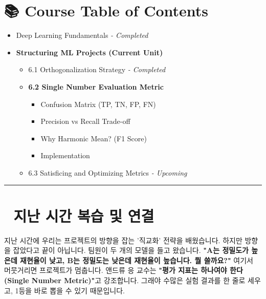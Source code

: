 \documentclass[11pt,a4paper]{book}
\theoremstyle{definition}
\begin{document}
\section*{📚 Course Table of Contents}
\begin{itemize}
    \item[Chapter 1-5.] Deep Learning Fundamentals \textit{- Completed}
    \item[\textbf{Chapter 6.}] \textbf{Structuring ML Projects (Current Unit)}
    \begin{itemize}
        \item 6.1 Orthogonalization Strategy \textit{- Completed}
        \item \textbf{6.2 Single Number Evaluation Metric}
        \begin{itemize}
            \item Confusion Matrix (TP, TN, FP, FN)
            \item Precision vs Recall Trade-off
            \item Why Harmonic Mean? (F1 Score)
            \item Implementation
        \end{itemize}
        \item 6.3 Satisficing and Optimizing Metrics \textit{- Upcoming}
    \end{itemize}
\end{itemize}

\vspace{0.5cm}
\hrule
\vspace{0.5cm}

\section*{🔗 지난 시간 복습 및 연결}
지난 시간에 우리는 프로젝트의 방향을 잡는 '직교화' 전략을 배웠습니다. 하지만 방향을 잡았다고 끝이 아닙니다.
팀원이 두 개의 모델을 들고 왔습니다.
\textbf{"A는 정밀도가 높은데 재현율이 낮고, B는 정밀도는 낮은데 재현율이 높습니다. 뭘 쓸까요?"}
여기서 머뭇거리면 프로젝트가 멈춥니다. 앤드류 응 교수는 \textbf{"평가 지표는 하나여야 한다(Single Number Metric)"}고 강조합니다. 그래야 수많은 실험 결과를 한 줄로 세우고, 1등을 바로 뽑을 수 있기 때문입니다.

\end{document}
